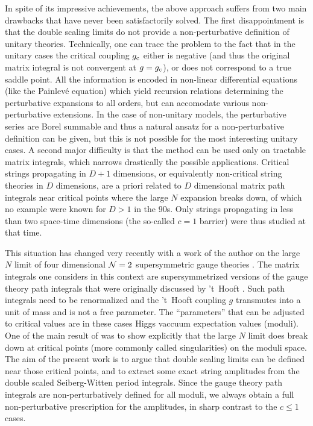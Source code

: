 \documentclass[a4paper,12pt]{article}
\begin{document}
In spite of its impressive achievements, the above approach suffers from
two main drawbacks that have never been satisfactorily solved. The first
disappointment is that the double
scaling limits do not provide a non-perturbative definition of unitary
theories. Technically, one can trace the problem to the fact that in 
the unitary cases the
critical coupling $g_{\rm c}$ either is negative (and thus the original
matrix integral is not convergent at $g=g_{\rm c}$), or does not
correspond to a true saddle point. All the information is encoded in
non-linear differential equations (like the Painlev\'e equation)
which yield recursion relations determining 
the perturbative expansions to all orders, but can
accomodate various non-perturbative extensions. In the case of
non-unitary models, the perturbative series are Borel summable and thus
a natural ansatz for a non-perturbative definition can be given, but
this is not possible for the most interesting unitary cases.
A second major difficulty is that the method can be used only on
tractable matrix integrals, which narrows drastically
the possible applications. Critical strings propagating 
in $D+1$ dimensions, or equivalently non-critical string 
theories in $D$ dimensions,
are a priori related to $D$ dimensional matrix path integrals near
critical points where the large $N$ expansion breaks down, of which no
example were known for $D>1$ in the 90s. Only strings propagating in 
less than two space-time dimensions (the so-called $c=1$ barrier) were
thus studied at that time. 

This situation has changed very recently with a work of the author on the
large $N$ limit of four dimensional
${\cal N}=2$ supersymmetric gauge theories \cite{fer}.
The matrix integrals one considers in this context are 
supersymmetrized versions of the gauge
theory path integrals that were originally discussed by 't~Hooft
\cite{tHooft}. Such path integrals need to be renormalized and the
't~Hooft coupling $g$ transmutes into a unit of mass and is not a free
parameter. The ``parameters''
that can be adjusted to critical values are in
these cases Higgs vaccuum expectation values (moduli).
One of the main result of \cite{fer} was to
show explicitly that the large $N$ limit does break
down at critical points (more commonly called singularities) on the
moduli space. The aim of the present work is to argue that double scaling
limits can be defined near those critical points, and to extract some
exact string
amplitudes from the double scaled Seiberg-Witten period integrals.
Since the gauge theory path integrals are non-perturbatively 
defined for all moduli, we always obtain a full 
non-perturbative prescription for the amplitudes, in sharp contrast to
the $c\leq 1$ cases.
\end{document}
